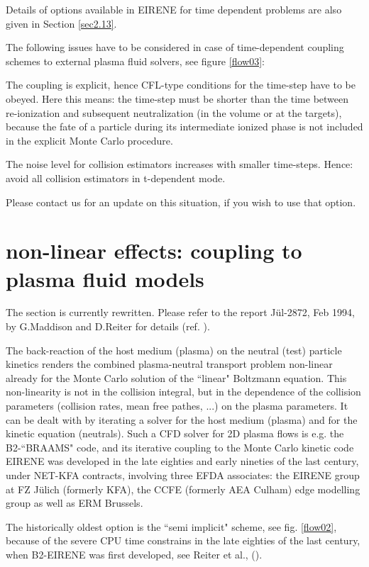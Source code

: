 Details of options available in EIRENE for time dependent problems are also given in Section \ref{sec2.13}.

The following issues have to be considered in case of time-dependent coupling schemes to external plasma fluid solvers,
see figure \ref{flow03}:

The coupling is explicit, hence CFL-type conditions for the
time-step have to be obeyed. Here this means: the time-step must
be shorter than the time between re-ionization and subsequent
neutralization (in the volume or at the targets), because the fate
of a particle during its intermediate ionized phase is not
included in the explicit Monte Carlo procedure.

The noise level for collision estimators increases with smaller
time-steps. Hence: avoid all collision estimators in t-dependent
mode.

Please contact us for an update on this situation, if you wish to
use that option.
\newpage
\section{non-linear effects: coupling to plasma fluid models} \label{sec1.7}
The section is currently rewritten. Please refer to the report
J\"ul-2872, Feb 1994, by G.Maddison and D.Reiter for details (ref.
\cite{kn:Maddison94}).

The back-reaction of the host medium (plasma) on the neutral (test) particle kinetics renders
the combined plasma-neutral transport problem non-linear already for the Monte Carlo solution of the ``linear" Boltzmann equation.
This non-linearity is not in the collision integral, but in the dependence of the collision parameters
(collision rates, mean free pathes, ...) on the plasma parameters. It can be dealt with by iterating a solver for the host medium (plasma) and for the kinetic equation (neutrals).
Such a CFD solver for 2D plasma flows is e.g. the B2-``BRAAMS" code, and its iterative coupling to the Monte Carlo kinetic code
EIRENE was developed in the late eighties and early nineties of the last century, under NET-KFA contracts, involving three EFDA associates:
the EIRENE group at FZ J\"ulich (formerly KFA), the CCFE (formerly AEA Culham) edge modelling group as well as ERM Brussels.


The historically oldest option is the ``semi implicit" scheme, see fig. \ref{flow02}, because of
the severe CPU time constrains in the late eighties of the last century, when B2-EIRENE was first
developed, see Reiter et al.,  (\cite{kn:Net}).

